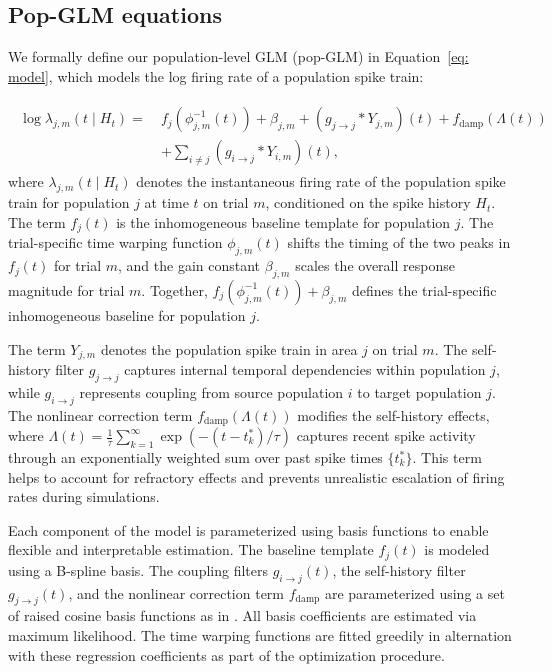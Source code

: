 \documentclass[12pt]{article}
\begin{document}
\subsection{Pop-GLM equations}

We formally define our population-level GLM (pop-GLM) in Equation~\ref{eq: model}, which models the log firing rate of a population spike train:

\begin{align}
\begin{split}
\log \lambda_{j, m} (t \mid H_t) = \ &f_j (\phi^{-1}_{j, m} (t)) + \beta_{j, m} + (g_{j \rightarrow j} * Y_{j, m})(t) + f_{\text{damp}}(\Lambda(t)) \\
&+ \sum_{i \neq j} (g_{i \rightarrow j} * Y_{i, m})(t),
\end{split}
\label{eq: model}
\end{align}
where $\lambda_{j, m}(t \mid H_t)$ denotes the instantaneous firing rate of the population spike train for population $j$ at time $t$ on trial $m$, conditioned on the spike history $H_t$. The term $f_j(t)$ is the inhomogeneous baseline template for population $j$. The trial-specific time warping function $\phi_{j, m}(t)$ shifts the timing of the two peaks in $f_j(t)$ for trial $m$, and the gain constant $\beta_{j, m}$ scales the overall response magnitude for trial $m$. Together, $f_j(\phi^{-1}_{j, m}(t)) + \beta_{j, m}$ defines the trial-specific inhomogeneous baseline for population $j$.

The term $Y_{j, m}$ denotes the population spike train in area $j$ on trial $m$. The self-history filter $g_{j \rightarrow j}$ captures internal temporal dependencies within population $j$, while $g_{i \rightarrow j}$ represents coupling from source population $i$ to target population $j$. The nonlinear correction term $f_{\text{damp}}(\Lambda(t))$ modifies the self-history effects, where $\Lambda(t) = \frac{1}{\tau}\sum_{k=1}^\infty \exp(-(t - t_k^*)/\tau)$ captures recent spike activity through an exponentially weighted sum over past spike times $\{t_k^*\}$. This term helps to account for refractory effects and prevents unrealistic escalation of firing rates during simulations.

Each component of the model is parameterized using basis functions to enable flexible and interpretable estimation. The baseline template $f_j(t)$ is modeled using a B-spline basis. The coupling filters $g_{i \rightarrow j}(t)$, the self-history filter $g_{j \rightarrow j}(t)$, and the nonlinear correction term $f_{\text{damp}}$ are parameterized using a set of raised cosine basis functions as in \citet{pillow2008spatio}. All basis coefficients are estimated via maximum likelihood. The time warping functions are fitted greedily in alternation with these regression coefficients as part of the optimization procedure.
\end{document}
